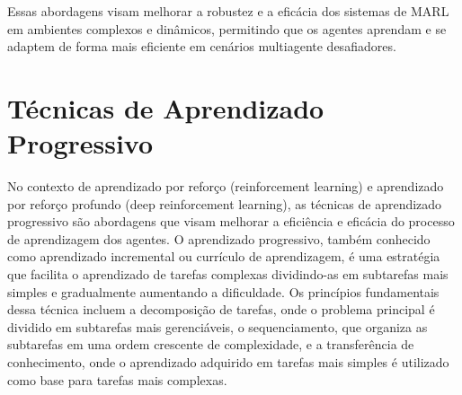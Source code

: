 Essas abordagens visam melhorar a robustez e a eficácia dos sistemas de MARL em ambientes complexos e dinâmicos, permitindo que os agentes aprendam e se adaptem de forma mais eficiente em cenários multiagente desafiadores.




\section{Técnicas de Aprendizado Progressivo}
\label{sec:aprendizado_prog}

No contexto de aprendizado por reforço (reinforcement learning) e aprendizado por reforço profundo (deep reinforcement learning), as técnicas de aprendizado progressivo são abordagens que visam melhorar a eficiência e eficácia do processo de aprendizagem dos agentes. O aprendizado progressivo, também conhecido como aprendizado incremental ou currículo de aprendizagem, é uma estratégia que facilita o aprendizado de tarefas complexas dividindo-as em subtarefas mais simples e gradualmente aumentando a dificuldade. Os princípios fundamentais dessa técnica incluem a decomposição de tarefas, onde o problema principal é dividido em subtarefas mais gerenciáveis, o sequenciamento, que organiza as subtarefas em uma ordem crescente de complexidade, e a transferência de conhecimento, onde o aprendizado adquirido em tarefas mais simples é utilizado como base para tarefas mais complexas. 

